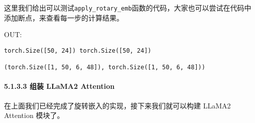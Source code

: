 \documentclass[12pt,a4paper]{book}
\begin{document}
这里我们给出可以测试\texttt{apply\_rotary\_emb}函数的代码，大家也可以尝试在代码中添加断点，来查看每一步的计算结果。

\begin{Shaded}
\begin{Highlighting}[]
\OperatorTok{=}\NormalTok{, }\NormalTok{, }\NormalTok{, }\NormalTok{) }
\OperatorTok{=}\NormalTok{, }\NormalTok{, }\NormalTok{, }\NormalTok{) }

\OperatorTok{=}\OperatorTok{//}\NormalTok{, }\NormalTok{)}
\OperatorTok{=}

\end{Highlighting}
\end{Shaded}

OUT:

\begin{verbatim}
torch.Size([50, 24]) torch.Size([50, 24])

(torch.Size([1, 50, 6, 48]), torch.Size([1, 50, 6, 48]))
\end{verbatim}

\paragraph{5.1.3.3 组装 LLaMA2
Attention}\label{ux7ec4ux88c5-llama2-attention}

在上面我们已经完成了旋转嵌入的实现，接下来我们就可以构建 LLaMA2
Attention 模块了。
\end{document}
